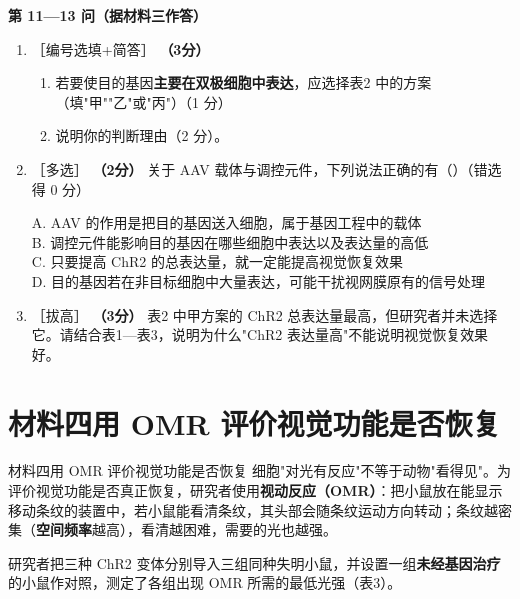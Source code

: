 \documentclass[UTF8,a4paper,11pt]{ctexart}
\newcommand{\pt}[1]{\textbf{（#1分）}}
\newcommand{\lv}[1]{{\small\color{deepgreen}［#1］}}
\newcommand{\tian}[1]{\underline{\hspace{#1}}}
\newcommand{\choice}[1]{\par\smallskip\noindent #1\par}
\begin{document}
\begin{qbox}
\noindent\textbf{\color{deepgreen}第 11—13 问（据材料三作答）}
\begin{enumerate}[leftmargin=2.2em,itemsep=5pt,start=11]
\item \lv{编号选填+简答} \pt{3}
\begin{enumerate}[label=(\arabic*),leftmargin=1.4em,itemsep=2pt]
\item 若要使目的基因\textbf{主要在双极细胞中表达}，应选择表2 中的方案\tian{0.8cm}（填"甲""乙"或"丙"）（1 分）
\item 说明你的判断理由（2 分）。
\end{enumerate}

\item \lv{多选} \pt{2} 关于 AAV 载体与调控元件，下列说法正确的有（\quad）（错选得 0 分）\\
\choice{A. AAV 的作用是把目的基因送入细胞，属于基因工程中的载体\\
B. 调控元件能影响目的基因在哪些细胞中表达以及表达量的高低\\
C. 只要提高 ChR2 的总表达量，就一定能提高视觉恢复效果\\
D. 目的基因若在非目标细胞中大量表达，可能干扰视网膜原有的信号处理}

\item \lv{拔高} \pt{3} 表2 中甲方案的 ChR2 总表达量最高，但研究者并未选择它。请结合表1—表3，说明为什么"ChR2 表达量高"不能说明视觉恢复效果好。
\end{enumerate}
\end{qbox}

\section{材料四\quad 用 OMR 评价视觉功能是否恢复}

\begin{matbox}{材料四\quad 用 OMR 评价视觉功能是否恢复}
细胞"对光有反应"不等于动物"看得见"。为评价视觉功能是否真正恢复，研究者使用\textbf{视动反应（OMR）}：把小鼠放在能显示移动条纹的装置中，若小鼠能看清条纹，其头部会随条纹运动方向转动；条纹越密集（\textbf{空间频率}越高），看清越困难，需要的光也越强。

研究者把三种 ChR2 变体分别导入三组同种失明小鼠，并设置一组\textbf{未经基因治疗}的小鼠作对照，测定了各组出现 OMR 所需的最低光强（表3）。
\end{matbox}
\end{document}
